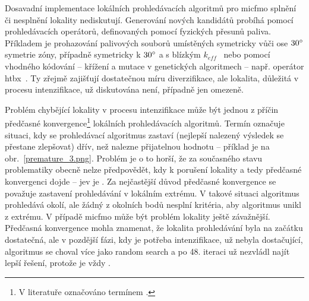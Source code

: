 Dosavadní implementace lokálních prohledávacích algoritmů pro \ac{micfmo} splnění či nesplnění lokality nediskutují. Generování nových kandidátů probíhá 
pomocí prohledávacích operátorů, definovaných pomocí fyzických přesunů paliva. Příkladem je prohazování palivových souborů umístěných symetricky vůči ose 
$30\degree$ symetrie zóny, případně symetricky k $30\degree$ a s blízkým $k_{eff}$~\cite{fejt} nebo pomocí vhodného kódování -- křížení a mutace 
v genetických algoritmech -- např. operátor \ac{htbx}~\cite{parks}. Ty zřejmě zajišťují 
dostatečnou míru diverzifikace, ale lokalita, důležitá v procesu intenzifikace, už diskutována není, případně jen omezeně.

Problém chybějící lokality v procesu intenzifikace může být jednou z příčin předčasné konvergence\footnote{V literatuře označováno 
termínem .} lokálních prohledávacích algoritmů. Termín označuje situaci, kdy se prohledávací algoritmus 
zastaví (nejlepší nalezený výsledek se přestane zlepšovat) dřív, než nalezne přijatelnou hodnotu -- příklad je na obr.~\ref{premature_3.png}. 
Problém je o to horší, že za současného stavu problematiky obecně nelze předpovědět, kdy k porušení lokality a tedy předčasné 
konvergenci dojde -- jev je .
Za nejčastější důvod předčasné konvergence se považuje zastavení prohledávání v lokálním extrému. V takové situaci algoritmus prohledává 
okolí, ale žádný z okolních bodů nesplní kritéria, aby algoritmus unikl z extrému.
V případě \ac{micfmo} může být problém lokality ještě závažnější. Předčasná konvergence mohla znamenat, že lokalita prohledávání byla na začátku dostatečná, ale 
v pozdější fázi, kdy je potřeba intenzifikace, už nebyla dostačující, algoritmus se choval více jako random search a po 48. iteraci už nezvládl najít lepší 
řešení, protože je vždy .

